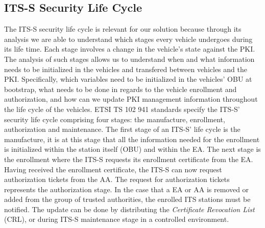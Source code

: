 \subsection{ITS-S Security Life Cycle}
\label{section:life-cycle}

The ITS-S security life cycle is relevant for our solution because through its analysis we are able to understand which stages every vehicle undergoes during its life time. Each stage involves a change in the vehicle's state against the PKI. The analysis of such stages allows us to understand when and what information needs to be initialized in the vehicles and transfered between vehicles and the PKI. Specifically, which variables need to be initialized in the vehicles’  OBU  at  bootstrap,  what  needs  to  be  done  in  regards  to  the  vehicle enrollment and authorization, and how can we update PKI management information throughout the life cycle of the vehicles.
ETSI TS 102 941 \cite{etsi_privacy} standards specify the ITS-S' security life cycle comprising four stages: the manufacture, enrollment, authorization and maintenance. The first stage of an ITS-S' life cycle is the manufacture, it is at this stage that all the information needed for the enrollment is initialized within the station itself (OBU) and within the EA. The next stage is the enrollment where the ITS-S requests its enrollment certificate from the EA. Having received the enrollment certificate, the ITS-S can now request authorization tickets from the  AA. The request for authorization tickets represents the authorization stage. In the case that a EA or AA is removed or added from the group of trusted authorities, the enrolled ITS stations must be notified. The update can be done by distributing the \textit{Certificate Revocation List} (CRL), or during ITS-S maintenance stage in a controlled environment. 


